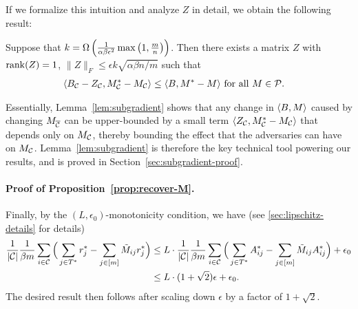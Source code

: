 If we formalize this intuition and analyze $Z$ in detail, we obtain the 
following result:
\begin{lemma}
\label{lem:subgradient}
Suppose that $k = \Omega\left( \frac{1}{\alpha\beta\epsilon^2}\max\left( 1,\frac{m}{n} \right) \right)$. 
Then there exists a matrix $Z$ with 
$\operatorname{rank}(Z) = 1$, $\|Z\|_F \leq \epsilon k\sqrt{\alpha\beta n/m}$ such that
\begin{align}
\langle B_{\mathcal{C}} - Z_{\mathcal{C}}, M^*_{\mathcal{C}} - M_{\mathcal{C}} \rangle &\leq \langle B, M^* - M \rangle \text{ for all $M \in \mathcal{P}$}.
\end{align}
\end{lemma}
Essentially, Lemma~\ref{lem:subgradient} shows that any change in 
$\langle B, M \rangle$ caused by changing $M_{\overline{\mathcal{C}}}$ can be upper-bounded 
by a small term $\langle Z_{\mathcal{C}}, M^*_{\mathcal{C}} - M_{\mathcal{C}} \rangle$ that depends only 
on $M_{\mathcal{C}}$, thereby bounding the effect that the adversaries can have 
on $M_{\mathcal{C}}$. Lemma~\ref{lem:subgradient} is therefore the key 
technical tool powering our results, and is proved in 
Section~\ref{sec:subgradient-proof}.

\paragraph{Proof of Proposition~\ref{prop:recover-M}.}
Finally, by the $(L,\epsilon_0)$-monotonicity condition, we have (see \ref{sec:lipschitz-details} for details)
\begin{align}
\label{eq:lipschitz-usage}
\frac{1}{|\mathcal{C}|}\frac{1}{\beta m}\sum_{i \in \mathcal{C}}\Big(\sum_{j \in T^*} r^*_j - \sum_{j \in [m]} \tilde{M}_{ij}r^*_j\Big) 
&\leq L \cdot \frac{1}{|\mathcal{C}|}\frac{1}{\beta m}\sum_{i \in \mathcal{C}}\Big(\sum_{j \in T^*} A^*_{ij} - \sum_{j \in [m]} \tilde{M}_{ij}A^*_{ij}\Big) + \epsilon_0 \\
&\leq L \cdot (1+\sqrt{2})\epsilon + \epsilon_0.
\end{align}
The desired result then follows after scaling down $\epsilon$ 
by a factor of $1+\sqrt{2}$.
